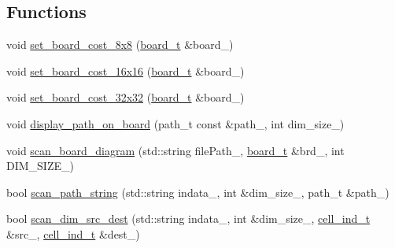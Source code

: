 \subsection*{\-Functions}
\begin{DoxyCompactItemize}
\item 
void \hyperlink{namespaceknight__t_a3e6565f6ba6e4c4a0d7f99a77e98f512}{set\-\_\-board\-\_\-cost\-\_\-8x8} (\hyperlink{classknight__t_1_1board__t}{board\-\_\-t} \&board\-\_\-)
\item 
void \hyperlink{namespaceknight__t_aa6559bcb41c6346eacdc20cdc008fffc}{set\-\_\-board\-\_\-cost\-\_\-16x16} (\hyperlink{classknight__t_1_1board__t}{board\-\_\-t} \&board\-\_\-)
\item 
void \hyperlink{namespaceknight__t_a12cca3e9b921cc18308343b9a24dcd38}{set\-\_\-board\-\_\-cost\-\_\-32x32} (\hyperlink{classknight__t_1_1board__t}{board\-\_\-t} \&board\-\_\-)
\item 
void \hyperlink{namespaceknight__t_ad485887f76b607376fdd722944d58e83}{display\-\_\-path\-\_\-on\-\_\-board} (path\-\_\-t const \&path\-\_\-, int dim\-\_\-size\-\_\-)
\item 
void \hyperlink{namespaceknight__t_a793729b067c32c8bd626cb0bd35a8d52}{scan\-\_\-board\-\_\-diagram} (std\-::string file\-Path\-\_\-, \hyperlink{classknight__t_1_1board__t}{board\-\_\-t} \&brd\-\_\-, int \-D\-I\-M\-\_\-\-S\-I\-Z\-E\-\_\-)
\item 
bool \hyperlink{namespaceknight__t_a1806048e3d1c32e842698eeb8ac1c0b6}{scan\-\_\-path\-\_\-string} (std\-::string indata\-\_\-, int \&dim\-\_\-size\-\_\-, path\-\_\-t \&path\-\_\-)
\item 
bool \hyperlink{namespaceknight__t_a1bbf1173124462b0f27e1415f5960b74}{scan\-\_\-dim\-\_\-src\-\_\-dest} (std\-::string indata\-\_\-, int \&dim\-\_\-size\-\_\-, \hyperlink{structknight__t_1_1cell__ind__t}{cell\-\_\-ind\-\_\-t} \&src\-\_\-, \hyperlink{structknight__t_1_1cell__ind__t}{cell\-\_\-ind\-\_\-t} \&dest\-\_\-)
\end{DoxyCompactItemize}
